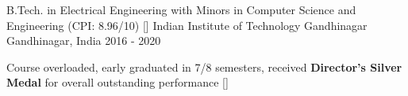 \begin{cventries}

  \cventry
    {B.Tech. in Electrical Engineering with Minors in Computer Science and Engineering {(CPI: 8.96/10)} []} %
    {Indian Institute of Technology Gandhinagar} %
    {Gandhinagar, India} %
    {2016 - 2020} %
    {
      \begin{cvitems} %
        \item {Course overloaded, early graduated in 7/8 semesters, received \textbf{Director's Silver Medal} for overall outstanding performance [{}]}
      \end{cvitems}
    }
\vspace{-0.2cm}
\end{cventries}
